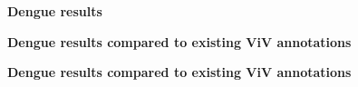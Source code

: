 \documentclass[landscape]{slides}
\begin{document}
\begin{slide}
\begin{center}
\textbf{Dengue results}

\vfill
\end{center}
\end{slide}
\begin{slide}
\begin{center}
\textbf{Dengue results compared to existing ViV annotations}

\vfill
\end{center}
\end{slide}
\begin{slide}
\begin{center}
\textbf{Dengue results compared to existing ViV annotations}

\vfill
\end{center}
\end{slide}
\end{document}
